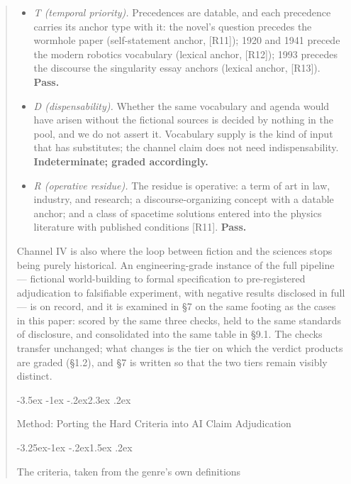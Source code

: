 \documentclass[11pt,a4paper]{article}
\makeatletter
\renewcommand\section{\@startsection{section}{1}{\z@}%
  {-3.5ex \@plus -1ex \@minus -.2ex}{2.3ex \@plus .2ex}%
  {\normalfont\Large\bfseries\raggedright}}
\renewcommand\subsection{\@startsection{subsection}{2}{\z@}%
  {-3.25ex\@plus -1ex \@minus -.2ex}{1.5ex \@plus .2ex}%
  {\normalfont\large\bfseries\raggedright}}
\makeatother
\begin{document}
\begin{abstract}
\begin{itemize}[leftmargin=1.6em,itemsep=2pt,parsep=0pt,topsep=3pt]
\item \textit{T (temporal priority).} Precedences are datable, and each precedence carries its anchor type with it: the novel's question precedes the wormhole paper (self-statement anchor, [R11]); 1920 and 1941 precede the modern robotics vocabulary (lexical anchor, [R12]); 1993 precedes the discourse the singularity essay anchors (lexical anchor, [R13]). \textbf{Pass.}
\item \textit{D (dispensability).} Whether the same vocabulary and agenda would have arisen without the fictional sources is decided by nothing in the pool, and we do not assert it. Vocabulary supply is the kind of input that has substitutes; the channel claim does not need indispensability. \textbf{Indeterminate; graded accordingly.}
\item \textit{R (operative residue).} The residue is operative: a term of art in law, industry, and research; a discourse-organizing concept with a datable anchor; and a class of spacetime solutions entered into the physics literature with published conditions [R11]. \textbf{Pass.}
\end{itemize}

Channel IV is also where the loop between fiction and the sciences stops being purely historical. An engineering-grade instance of the full pipeline — fictional world-building to formal specification to pre-registered adjudication to falsifiable experiment, with negative results disclosed in full — is on record, and it is examined in §7 on the same footing as the cases in this paper: scored by the same three checks, held to the same standards of disclosure, and consolidated into the same table in §9.1. The checks transfer unchanged; what changes is the tier on which the verdict products are graded (§1.2), and §7 is written so that the two tiers remain visibly distinct.

\section{Method: Porting the Hard Criteria into AI Claim Adjudication}

\subsection{The criteria, taken from the genre's own definitions}


\end{abstract}
\end{document}
